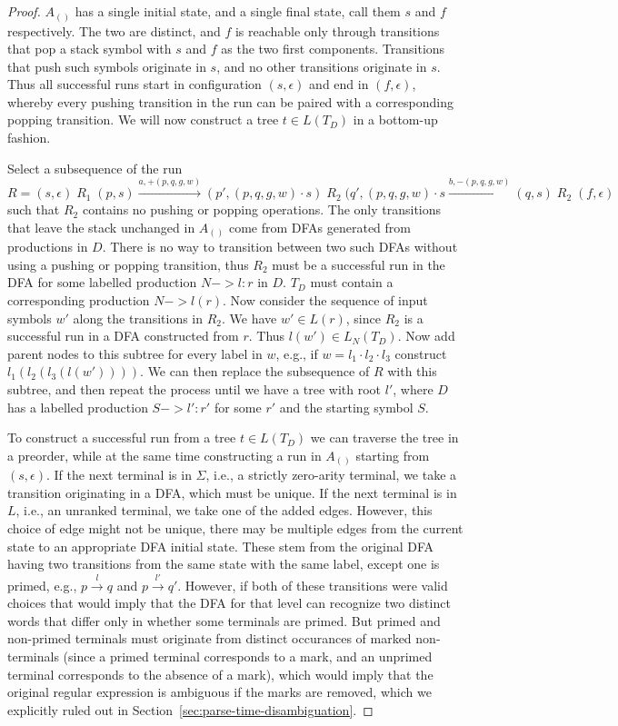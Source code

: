 \documentclass[acmsmall,review,anonymous]{acmart}\settopmatter{printfolios=true,printccs=false,printacmref=false}
\newcommand{\T}{\Sigma} %
\newcommand{\Labels}{L} %
\begin{document}
\begin{proof}
  $A_{()}$ has a single initial state, and a single final state, call them $s$ and $f$ respectively. The two are distinct, and $f$ is reachable only through transitions that pop a stack symbol with $s$ and $f$ as the two first components. Transitions that push such symbols originate in $s$, and no other transitions originate in $s$. Thus all successful runs start in configuration $(s, \epsilon)$ and end in $(f, \epsilon)$, whereby every pushing transition in the run can be paired with a corresponding popping transition. We will now construct a tree $t \in L(T_D)$ in a bottom-up fashion.

  Select a subsequence of the run $R = (s, \epsilon) \; R_1 \; (p, s) \xrightarrow{a, +(p, q, g, w)} (p', (p, q, g, w) \cdot s) \; R_2 \; (q', (p, q, g, w) \cdot s \xrightarrow{b, -(p, q, g, w)} (q, s) \; R_2 \; (f, \epsilon)$ such that $R_2$ contains no pushing or popping operations. The only transitions that leave the stack unchanged in $A_{()}$ come from DFAs generated from productions in $D$. There is no way to transition between two such DFAs without using a pushing or popping transition, thus $R_2$ must be a successful run in the DFA for some labelled production $N -> l : r$ in $D$. $T_D$ must contain a corresponding production $N -> l(r)$. Now consider the sequence of input symbols $w'$ along the transitions in $R_2$. We have $w' \in L(r)$, since $R_2$ is a successful run in a DFA constructed from $r$. Thus $l(w') \in L_N(T_D)$. Now add parent nodes to this subtree for every label in $w$, e.g., if $w = l_1 \cdot l_2 \cdot l_3$ construct $l_1(l_2(l_3(l(w'))))$. We can then replace the subsequence of $R$ with this subtree, and then repeat the process until we have a tree with root $l'$, where $D$ has a labelled production $S -> l': r'$ for some $r'$ and the starting symbol $S$.

  To construct a successful run from a tree $t \in L(T_D)$ we can traverse the tree in a preorder, while at the same time constructing a run in $A_{()}$ starting from $(s, \epsilon)$. If the next terminal is in $\T$, i.e., a strictly zero-arity terminal, we take a transition originating in a DFA, which must be unique. If the next terminal is in $\Labels$, i.e., an unranked terminal, we take one of the added edges. However, this choice of edge might not be unique, there may be multiple edges from the current state to an appropriate DFA initial state. These stem from the original DFA having two transitions from the same state with the same label, except one is primed, e.g., $p \xrightarrow{l} q$ and $p \xrightarrow{l'} q'$. However, if both of these transitions were valid choices that would imply that the DFA for that level can recognize two distinct words that differ only in whether some terminals are primed. But primed and non-primed terminals must originate from distinct occurances of marked non-terminals (since a primed terminal corresponds to a mark, and an unprimed terminal corresponds to the absence of a mark), which would imply that the original regular expression is ambiguous if the marks are removed, which we explicitly ruled out in Section~\ref{sec:parse-time-disambiguation}.


\end{proof}
\end{document}
